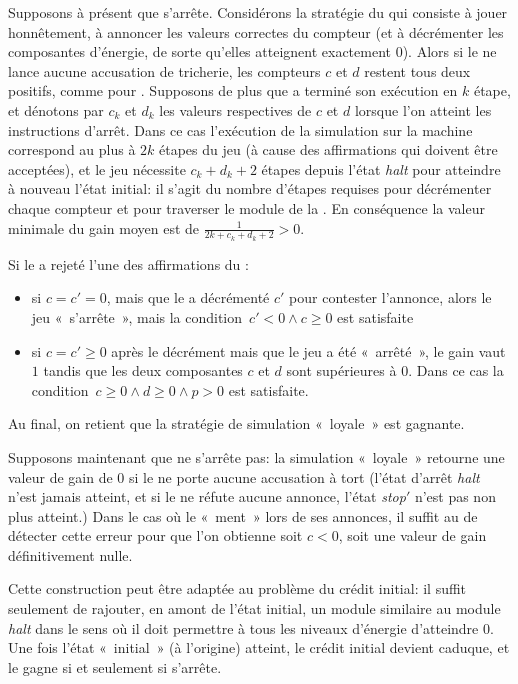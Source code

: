 Supposons à présent que \machine s'arrête.
Considérons la stratégie du \jo qui consiste à jouer honnêtement, \cad à annoncer les valeurs correctes du compteur (et à décrémenter les composantes d'énergie, de sorte qu'elles atteignent exactement $0$).
Alors si le \ji ne lance aucune accusation de tricherie, les compteurs $c$ et $d$ restent tous deux positifs, comme pour \machine.
Supposons de plus que \machine a terminé son exécution en $k$ étape, et dénotons par $c_k$ et $d_k$ les valeurs respectives de $c$ et $d$ lorsque l'on atteint les instructions d'arrêt.
Dans ce cas l'exécution de la simulation sur la machine correspond au plus à $2k$ étapes du jeu (à cause des affirmations qui doivent être acceptées), et le jeu nécessite $c_k+d_k+2$ étapes depuis l'état \emph{halt} pour atteindre à nouveau l'état initial: il s'agit du nombre d'étapes requises pour décrémenter chaque compteur et pour traverser le module de la .
En conséquence la valeur minimale du gain moyen est de $\frac1{2k+c_k+d_k+2}>0$.

Si le \ji a rejeté l'une des affirmations du \jo:
\begin{itemize}
\item si $c=c'=0$, mais que le \ji a décrémenté $c'$ pour contester l'annonce, alors le jeu « s'arrête », mais la condition~$c'<0 \wedge c\geq0$ est satisfaite
\item si $c=c'\geq0$ après le décrément mais que le jeu a été « arrêté », le gain vaut $1$ tandis que les deux composantes $c$ et $d$ sont supérieures à $0$. Dans ce cas la condition~$c\geq0 \wedge d\geq0 \wedge p>0$ est satisfaite.
\end{itemize}

Au final, on retient que la stratégie de simulation « loyale » est gagnante.

\bigskip

Supposons maintenant que \machine ne s'arrête pas: la simulation « loyale » retourne une valeur de gain de $0$ si le \ji ne porte aucune accusation à tort (l'état d'arrêt \emph{halt} n'est jamais atteint, et si le \ji ne réfute aucune annonce, l'état \emph{stop$'$} n'est pas non plus atteint.)
Dans le cas où le \jo « ment » lors de ses annonces, il suffit au \ji de détecter cette erreur pour que l'on obtienne soit $c<0$, soit une valeur de gain définitivement nulle.

\bigskip

Cette construction peut être adaptée au problème du crédit initial: il suffit seulement de rajouter, en amont de l'état initial, un module similaire au module \emph{halt} dans le sens où il doit permettre à tous les niveaux d'énergie d'atteindre $0$.
Une fois l'état « initial » (à l'origine) atteint, le crédit initial devient caduque, et le \jo gagne si et seulement si \machine s'arrête.

